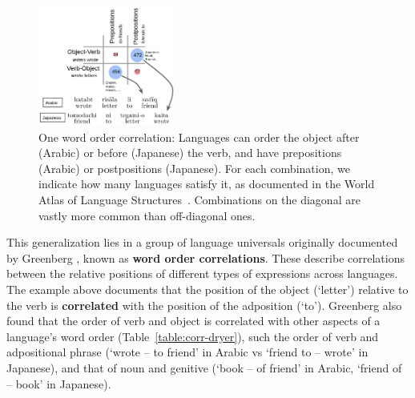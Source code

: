 \documentclass[9pt,twocolumn,twoside,lineno]{pnas-new}
\newcommand{\key}[1]{\textbf{#1}}
\begin{document}
\begin{figure}
    \centering
    \includegraphics[width=0.4\textwidth]{figures/corr-full.png}
\caption{ One word order correlation: Languages can order the object after (Arabic) or before (Japanese) the verb, and have prepositions (Arabic) or postpositions (Japanese). For each combination, we indicate how many languages satisfy it, as documented in the World Atlas of Language Structures~\cite{wals}. Combinations on the diagonal are vastly more common than off-diagonal ones. 
	}\label{fig:arabic-japanese-simple}	\label{fig:corr-table}
\end{figure}



This generalization lies in a group of language universals originally documented by Greenberg \cite{greenberg1963universals}, known as \key{word order correlations}.
These describe correlations between the relative positions of different types of expressions across languages.
The example above documents that the position of the object (`letter') relative to the verb is \key{correlated} with the position of the adposition (`to'). %
Greenberg also found that the order of verb and object is correlated with other aspects of a language's word order (Table~\ref{table:corr-dryer}), such the order of verb and adpositional phrase (`wrote -- to friend' in Arabic vs `friend to -- wrote' in Japanese), and that of noun and genitive (`book -- of friend' in Arabic, `friend of -- book' in Japanese).
\end{document}
